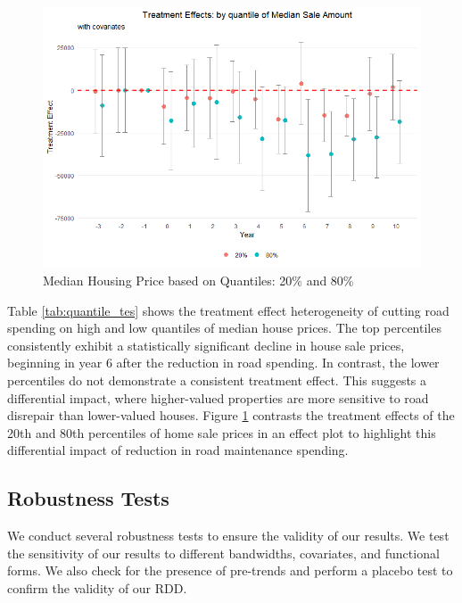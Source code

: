 \begin{figure}[htbp]
    \centering
    \includegraphics[width=\textwidth,keepaspectratio]{images/tes_qte_re.png}    
    \caption{Median Housing Price based on Quantiles: 20\% and 80\%}
    \label{fig:tes_qte_covs}
\end{figure}

Table \ref{tab:quantile_tes} shows the treatment effect heterogeneity of cutting road spending on high and low quantiles of median house prices. The top percentiles consistently exhibit a statistically significant decline in house sale prices, beginning in year 6 after the reduction in road spending. In contrast, the lower percentiles do not demonstrate a consistent treatment effect. This suggests a differential impact, where higher-valued properties are more sensitive to road disrepair than lower-valued houses. Figure \ref{fig:tes_qte_covs} contrasts the treatment effects of the 20th and 80th percentiles of home sale prices in an effect plot to highlight this differential impact of reduction in road maintenance spending.

\subsection{Robustness Tests}

We conduct several robustness tests to ensure the validity of our results. We test the sensitivity of our results to different bandwidths, covariates, and functional forms. We also check for the presence of pre-trends and perform a placebo test to confirm the validity of our RDD.

